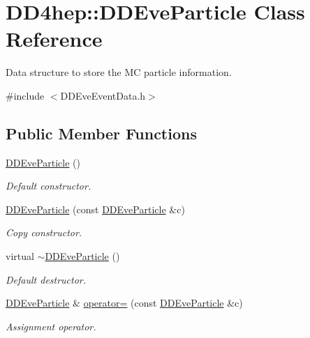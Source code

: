 \hypertarget{class_d_d4hep_1_1_d_d_eve_particle}{
\section{DD4hep::DDEveParticle Class Reference}
\label{class_d_d4hep_1_1_d_d_eve_particle}
}


Data structure to store the MC particle information.  


{\ttfamily \#include $<$DDEveEventData.h$>$}\subsection*{Public Member Functions}
\begin{DoxyCompactItemize}
\item 
\hyperlink{class_d_d4hep_1_1_d_d_eve_particle_a8ef98497c0ce8ee341913e031ffaf265}{DDEveParticle} ()
\begin{DoxyCompactList}\small\item\em Default constructor. \item\end{DoxyCompactList}\item 
\hyperlink{class_d_d4hep_1_1_d_d_eve_particle_a3c869edc6c878c86cc596f7f435c87f4}{DDEveParticle} (const \hyperlink{class_d_d4hep_1_1_d_d_eve_particle}{DDEveParticle} \&c)
\begin{DoxyCompactList}\small\item\em Copy constructor. \item\end{DoxyCompactList}\item 
virtual \hyperlink{class_d_d4hep_1_1_d_d_eve_particle_ac09bab207cb97dc1348aceb043319123}{$\sim$DDEveParticle} ()
\begin{DoxyCompactList}\small\item\em Default destructor. \item\end{DoxyCompactList}\item 
\hyperlink{class_d_d4hep_1_1_d_d_eve_particle}{DDEveParticle} \& \hyperlink{class_d_d4hep_1_1_d_d_eve_particle_aa435c5ef002b03be3f38e5fd5c313b62}{operator=} (const \hyperlink{class_d_d4hep_1_1_d_d_eve_particle}{DDEveParticle} \&c)
\begin{DoxyCompactList}\small\item\em Assignment operator. \item\end{DoxyCompactList}\end{DoxyCompactItemize}
